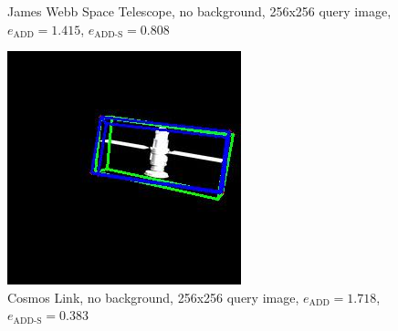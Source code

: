 \begin{figure}[h]
\begin{minipage}{0.45\linewidth}
        \caption{James Webb Space Telescope, no background, 256x256 query image, $e_\mathrm{ADD}=1.415$, $e_{\mathrm{ADD}\text{-}\mathrm{S}}=0.808$ }
        \label{fig:image2}
    \end{minipage}
\end{figure}

\begin{figure}[h]
    \centering
    \begin{minipage}{0.45\linewidth}
        \centering
        \includegraphics[width=\linewidth]{data/fig5.jpg} %
        \caption{Cosmos Link, no background, 256x256 query image, $e_\mathrm{ADD}=1.718$, $e_{\mathrm{ADD}\text{-}\mathrm{S}}=0.383$ }
        \label{fig:image1}
    \end{minipage}\hfill
    \begin{minipage}{0.45\linewidth}
        \centering

\end{minipage}
\end{figure}
